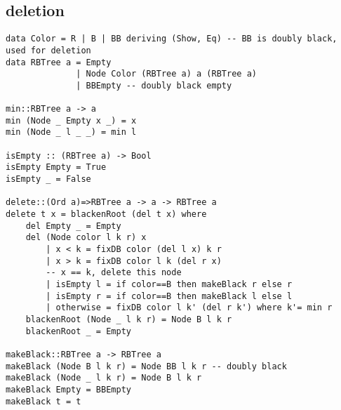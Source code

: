 \documentclass{article}
\begin{document}
\subsection{deletion}



\begin{lstlisting}[caption=Red-black tree deletion algorithm with the concept of 'doubly black'.]
data Color = R | B | BB deriving (Show, Eq) -- BB is doubly black, used for deletion
data RBTree a = Empty
              | Node Color (RBTree a) a (RBTree a)
              | BBEmpty -- doubly black empty

min::RBTree a -> a
min (Node _ Empty x _) = x
min (Node _ l _ _) = min l

isEmpty :: (RBTree a) -> Bool
isEmpty Empty = True
isEmpty _ = False

delete::(Ord a)=>RBTree a -> a -> RBTree a
delete t x = blackenRoot (del t x) where
    del Empty _ = Empty
    del (Node color l k r) x
        | x < k = fixDB color (del l x) k r
        | x > k = fixDB color l k (del r x)
        -- x == k, delete this node
        | isEmpty l = if color==B then makeBlack r else r
        | isEmpty r = if color==B then makeBlack l else l
        | otherwise = fixDB color l k' (del r k') where k'= min r
    blackenRoot (Node _ l k r) = Node B l k r
    blackenRoot _ = Empty

makeBlack::RBTree a -> RBTree a
makeBlack (Node B l k r) = Node BB l k r -- doubly black
makeBlack (Node _ l k r) = Node B l k r
makeBlack Empty = BBEmpty
makeBlack t = t


\end{lstlisting}
\end{document}
